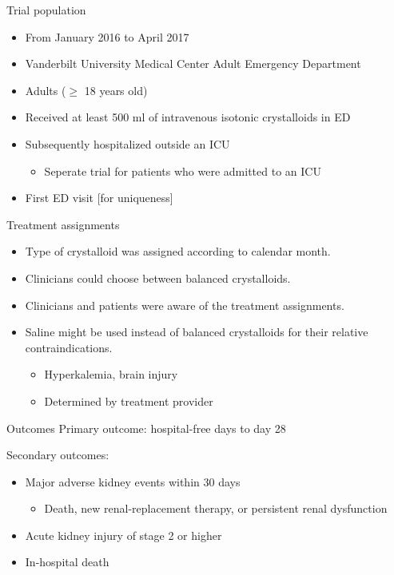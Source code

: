\documentclass{beamer}
\begin{document}
\begin{frame}{Trial population}
    \begin{itemize}
        \item From January 2016 to April 2017
        \item Vanderbilt University Medical Center Adult Emergency Department
        \item Adults ($\ge$ 18 years old)
        \item Received at least 500 ml of intravenous isotonic crystalloids in ED
        \item Subsequently hospitalized outside an ICU
            \begin{itemize}
                \item Seperate trial for patients who were admitted to an ICU
            \end{itemize}
        \item First ED visit [for uniqueness]
    \end{itemize}
\end{frame}

\begin{frame}{Treatment assignments}
    \begin{itemize}
        \item Type of crystalloid was assigned according to calendar month.
        \item Clinicians could choose between balanced crystalloids.
        \item Clinicians and patients were aware of the treatment assignments.
        \item Saline might be used instead of balanced crystalloids for their relative contraindications.
            \begin{itemize}
                \item Hyperkalemia, brain injury
                \item Determined by treatment provider
            \end{itemize}
    \end{itemize}
\end{frame}

\begin{frame}{Outcomes}
    Primary outcome: hospital-free days to day 28

    Secondary outcomes:
    \begin{itemize}
        \item Major adverse kidney events within 30 days
            \begin{itemize}
                \item Death, new renal-replacement therapy, or persistent renal dysfunction
            \end{itemize}
        \item Acute kidney injury of stage 2 or higher
        \item In-hospital death
    \end{itemize}
\end{frame}
\end{document}
